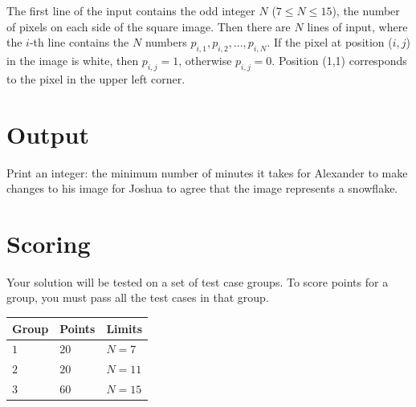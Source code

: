 The first line of the input contains the odd integer $N$ ($7 \le N \le 15$), the number of pixels on each side of the square image.
Then there are $N$ lines of input, where the $i$-th line contains the $N$ numbers $p_{i,1}, p_{i,2}, ..., p_{i,N}$.
If the pixel at position ($i, j$) in the image is white, then $p_{i, j} = 1$, otherwise $p_{i, j} = 0$.
Position (1,1) corresponds to the pixel in the upper left corner.


\section*{Output}

Print an integer: the minimum number of minutes it takes for Alexander to make changes
to his image for Joshua to agree that the image represents a snowflake.

\section*{Scoring}

Your solution will be tested on a set of test case groups.
To score points for a group, you must pass all the test cases in that group.

\begin{tabular}{| l | l | p{12cm} |}
  \hline
  \textbf{Group} & \textbf{Points} & \textbf{Limits} \\ \hline
  $1$    & $20$       & $N=7$ \\ \hline
  $2$    & $20$       & $N=11$ \\ \hline
  $3$    & $60$       & $N=15$ \\ \hline
\end{tabular}
